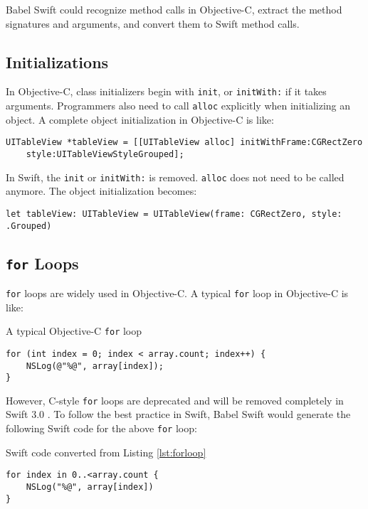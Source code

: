 \documentclass{sfuthesis}
\begin{document}
Babel Swift could recognize method calls in Objective-C, extract the method signatures and arguments, and convert them to Swift method calls.

\subsection{Initializations}

In Objective-C, class initializers begin with \texttt{init}, or \texttt{initWith:} if it takes arguments. Programmers also need to call \texttt{alloc} explicitly when initializing an object. A complete object initialization in Objective-C is like:

\begin{verbatim}
UITableView *tableView = [[UITableView alloc] initWithFrame:CGRectZero
    style:UITableViewStyleGrouped];
\end{verbatim}

In Swift, the \texttt{init} or \texttt{initWith:} is removed. \texttt{alloc} does not need to be called anymore. The object initialization becomes:

\begin{verbatim}
let tableView: UITableView = UITableView(frame: CGRectZero, style: .Grouped)
\end{verbatim}

\subsection{\texttt{for} Loops}

\texttt{for} loops are widely used in Objective-C. A typical \texttt{for} loop in Objective-C is like:

\begin{listing}[H]
\caption{A typical Objective-C \texttt{for} loop}
\label{lst:forloop}
\begin{verbatim}
for (int index = 0; index < array.count; index++) {
    NSLog(@"%@", array[index]);
}
\end{verbatim}
\end{listing}

However, C-style \texttt{for} loops are deprecated and will be removed completely in Swift 3.0 \cite{removecforloops}. To follow the best practice in Swift, Babel Swift would generate the following Swift code for the above \texttt{for} loop:

\begin{listing}[H]
\caption{Swift code converted from Listing \ref{lst:forloop}}
\begin{verbatim}
for index in 0..<array.count {
    NSLog("%@", array[index])
}
\end{verbatim}
\end{listing}
\end{document}
